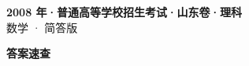 \documentclass[zihao=-4, a4paper]{ctexart}
\begin{document}
\begin{center}
  {\Large\bfseries 2008 年·普通高等学校招生考试·山东卷·理科}\\[4pt]
  {\large 数学 · 简答版}
\end{center}
\medskip
{}

\clearpage
{}
\begin{center}{\Large\bfseries 答案速查}\end{center}
\medskip

\end{document}
